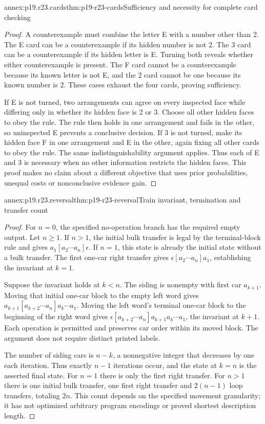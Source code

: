 \begin{annexitem}{annex:p19.r23.cards}{thm:p19-r23-cards}{Sufficiency and necessity for complete card checking}
\begin{proof}
A counterexample must combine the letter E with a number other than 2.
The E card can be a counterexample if its hidden number is not 2.
The 3 card can be a counterexample if its hidden letter is E.
Turning both reveals whether either
counterexample is present. The F card cannot be a counterexample because
its known letter is not E, and the 2 card cannot be one because
its known number is 2. These cases exhaust the four cards, proving
sufficiency.

If E is not turned, two arrangements can agree on every inspected
face while differing only in whether its hidden face is 2 or 3. Choose
all other hidden faces to obey the rule. The rule then holds in one
arrangement and fails in the other, so uninspected E prevents a
conclusive decision. If 3 is not turned, make its hidden face F in one
arrangement and E in the other, again fixing all other cards to obey
the rule. The same indistinguishability argument applies. Thus each of
E and 3 is necessary when no other information restricts the hidden
faces. This proof makes no claim about a different objective that uses
prior probabilities, unequal costs or nonconclusive evidence gain.
\end{proof}
\end{annexitem}

\begin{annexitem}{annex:p19.r23.reversal}{thm:p19-r23-reversal}{Train invariant, termination and transfer count}
\begin{proof}
For \(n=0\), the specified no-operation branch has the required
empty output. Let \(n\geq1\). If \(n>1\), the initial bulk
transfer is legal by the terminal-block rule and gives
\(a_1[a_2\cdots a_n]\epsilon\). If \(n=1\), this state is
already the initial state without a bulk transfer. The first one-car
right transfer gives \(\epsilon[a_2\cdots a_n]a_1\), establishing
the invariant at \(k=1\).

Suppose the invariant holds at \(k<n\). The siding is nonempty
with first car \(a_{k+1}\). Moving that initial one-car block to
the empty left word gives
\(a_{k+1}[a_{k+2}\cdots a_n]a_k\cdots a_1\).
Moving the left word's terminal one-car block to the beginning of
the right word gives
\(\epsilon[a_{k+2}\cdots a_n]a_{k+1}a_k\cdots a_1\),
the invariant at \(k+1\). Each operation is permitted and preserves
car order within its moved block. The argument does not require
distinct printed labels.

The number of siding cars is \(n-k\), a nonnegative integer that
decreases by one each iteration. Thus exactly \(n-1\) iterations
occur, and the state at \(k=n\) is the asserted final state.
For \(n=1\) there is only the first right transfer. For \(n>1\)
there is one initial bulk transfer, one first right transfer and
\(2(n-1)\) loop transfers, totaling \(2n\). This count depends
on the specified movement granularity; it has not optimized arbitrary
program encodings or proved shortest description length.
\end{proof}
\end{annexitem}
